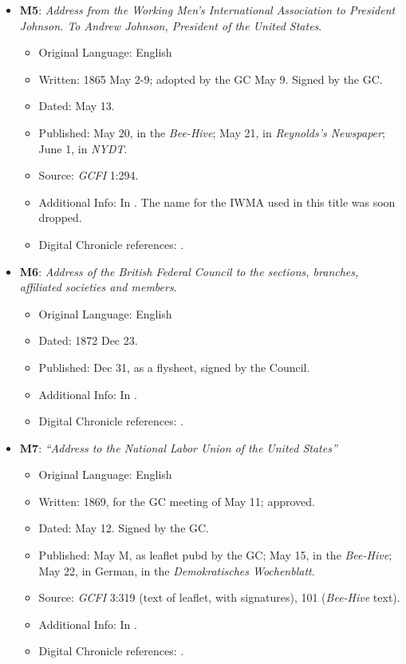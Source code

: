 \begin{itemize}
    \item \textbf{M5}: \textit{Address from the Working Men’s International Association to President Johnson. To Andrew Johnson, President of the United States}.
    \begin{itemize}
        \item Original Language: English
        \item Written: 1865 May 2-9; adopted by the GC May 9. Signed by the GC.
        \item Dated: May 13.
        \item Published: May 20, in the \textit{Bee-Hive}; May 21, in \textit{Reynolds's Newspaper}; June 1, in \textit{NYDT}.
        \item Source: \textit{GCFI} 1:294.
        \item Additional Info: In . The name for the IWMA used in this title was soon dropped.
        \item Digital Chronicle references: .
    \end{itemize}

    \item \textbf{M6}: \textit{Address of the British Federal Council to the sections, branches, affiliated societies and members}.
    \begin{itemize}
        \item Original Language: English
        \item Dated: 1872 Dec 23.
        \item Published: Dec 31, as a flysheet, signed by the Council.
        \item Additional Info: In .
        \item Digital Chronicle references: .
    \end{itemize}

    \item \textbf{M7}: \textit{``Address to the National Labor Union of the United States''}
    \begin{itemize}
        \item Original Language: English
        \item Written: 1869, for the GC meeting of May 11; approved.
        \item Dated: May 12. Signed by the GC.
        \item Published: May M, as leaflet pubd by the GC; May 15, in the \textit{Bee-Hive}; May 22, in German, in the \textit{Demokratisches Wochenblatt}.
        \item Source: \textit{GCFI} 3:319 (text of leaflet, with signatures), 101 (\textit{Bee-Hive} text).
        \item Additional Info: In .
        \item Digital Chronicle references: .
    \end{itemize}


\end{itemize}
